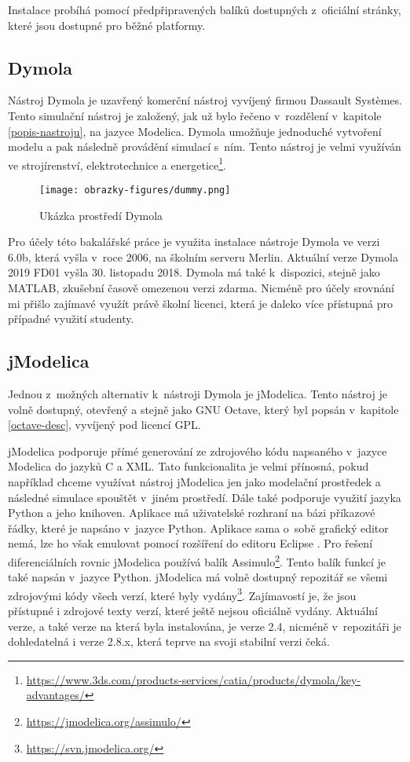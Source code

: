 Instalace probíhá pomocí předpřipravených balíků dostupných z~oficiální stránky, které jsou dostupné pro běžné platformy.

\subsection{Dymola}
\label{dymola-desc}

Nástroj Dymola je uzavřený komerční nástroj vyvíjený firmou Dassault Systèmes. Tento simulační nástroj je založený, jak už bylo řečeno v~rozdělení v~kapitole \ref{popis-nastroju}, na jazyce Modelica. Dymola umožňuje jednoduché vytvoření modelu a pak následně provádění simulací s~ním. Tento nástroj je velmi využíván ve strojírenství, elektrotechnice a energetice\footnote{\url{https://www.3ds.com/products-services/catia/products/dymola/key-advantages/}}.

\begin{figure}[ht]
    \centering
    \texttt{[image: obrazky-figures/dummy.png]}
    \caption{Ukázka prostředí Dymola}
    \label{fig:dymola}
\end{figure}

Pro účely této bakalářské práce je využita instalace nástroje Dymola ve verzi 6.0b, která vyšla v~roce 2006, na školním serveru Merlin. Aktuální verze Dymola 2019 FD01 vyšla 30. listopadu 2018. Dymola má také k~dispozici, stejně jako MATLAB, zkušební časově omezenou verzi zdarma. Nicméně pro účely srovnání mi přišlo zajímavé využít právě školní licenci, která je daleko více přístupná pro případné využití studenty.


\subsection{jModelica}
\label{jmodelica}
Jednou z~možných alternativ k~nástroji Dymola je jModelica. Tento nástroj je volně dostupný, otevřený a stejně jako GNU Octave, který byl popsán v~kapitole \ref{octave-desc}, vyvíjený pod licencí GPL.  

jModelica podporuje přímé generování ze zdrojového kódu napsaného v~jazyce Modelica do jazyků C a XML. Tato funkcionalita je velmi přínosná, pokud například chceme využívat nástroj jModelica jen jako modelační prostředek a následné simulace spouštět v~jiném prostředí. Dále také podporuje využití jazyka Python a jeho knihoven. Aplikace má uživatelské rozhraní na bázi příkazové řádky, které je napsáno v~jazyce Python. Aplikace sama o~sobě grafický editor nemá, lze ho však emulovat pomocí rozšíření do editoru Eclipse \cite{modelica-example}. Pro řešení diferenciálních rovnic jModelica používá balík Assimulo\footnote{\url{https://jmodelica.org/assimulo/}}. Tento balík funkcí je také napsán v~jazyce Python. 
jModelica má volně dostupný repozitář se všemi zdrojovými kódy všech verzí, které byly vydány\footnote{\url{https://svn.jmodelica.org/}}. Zajímavostí je, že jsou přístupné i zdrojové texty verzí, které ještě nejsou oficiálně vydány. Aktuální verze, a také verze na která byla instalována, je verze 2.4, nicméně v~repozitáři je dohledatelná i verze 2.8.x, která teprve na svoji stabilní verzi čeká.

